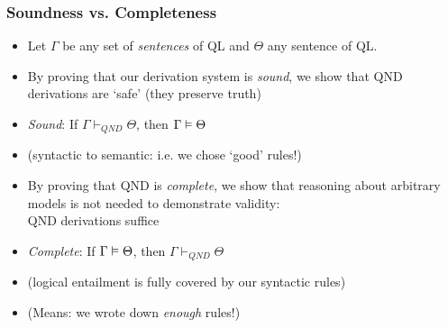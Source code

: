 \begin{frame}
\frametitle{Soundness vs. Completeness}



\begin{itemize}[<+->]

\item Let $\Gamma$ be any set of \textit{sentences} of QL and $\Theta$ any sentence of QL. 

\item By proving that our derivation system is \textit{sound}, we show that QND derivations are `safe' (they preserve truth)

\medskip 

\bi

\item \emph{Sound}: If $\Gamma \vdash_{QND} \Theta$, then $\Gamma \vDash \Theta$

\item (syntactic to semantic: i.e. we chose `good' rules!)

\ei

\bigskip 

\item By proving that QND is \textit{complete}, we show that reasoning about arbitrary models is not needed to demonstrate validity: \\ QND derivations suffice

\medskip 

\bi

\item \emph{Complete}: If $\Gamma \vDash \Theta$, then $\Gamma \vdash_{QND} \Theta$

\item (logical entailment is fully covered by our syntactic rules)

\item (Means: we wrote down \textit{enough} rules!)

\ei

\end{itemize}
\end{frame}

